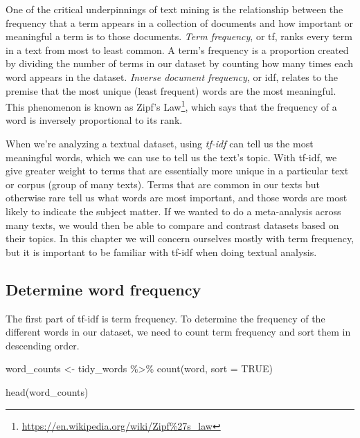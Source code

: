 \documentclass[
  krantz2]{krantz}
\makeatletter
\newenvironment{Shaded}{\begin{snugshade}}{\end{snugshade}}
\newcommand{\AttributeTok}[1]{\textcolor[rgb]{0.61,0.61,0.61}{#1}}
\newcommand{\ConstantTok}[1]{\textcolor[rgb]{0,0,0}{#1}}
\newcommand{\FunctionTok}[1]{\textcolor[rgb]{0,0,0}{#1}}
\newcommand{\NormalTok}[1]{#1}
\newcommand{\OtherTok}[1]{\textcolor[rgb]{0.37,0.37,0.37}{#1}}
\newcommand{\SpecialCharTok}[1]{\textcolor[rgb]{0,0,0}{#1}}
\newenvironment{kframe}{%
\medskip{}
\setlength{\fboxsep}{.8em}
 \def\at@end@of@kframe{}%
 \ifinner\ifhmode%
  \def\at@end@of@kframe{\end{minipage}}%
  \begin{minipage}{\columnwidth}%
 \fi\fi%
 \def\FrameCommand##1{\hskip\@totalleftmargin \hskip-\fboxsep
 \colorbox{shadecolor}{##1}\hskip-\fboxsep
     \hskip-\linewidth \hskip-\@totalleftmargin \hskip\columnwidth}%
 \MakeFramed {\advance\hsize-\width
   \@totalleftmargin\z@ \linewidth\hsize
   \@setminipage}}%
 {\par\unskip\endMakeFramed%
 \at@end@of@kframe}
\renewenvironment{Shaded}{\begin{kframe}}{\end{kframe}}
\makeatother
\begin{document}
One of the critical underpinnings of text mining is the relationship between the frequency that a term appears in a collection of documents and how important or meaningful a term is to those documents. \emph{Term frequency}, or tf, ranks every term in a text from most to least common. A term's frequency is a proportion created by dividing the number of terms in our dataset by counting how many times each word appears in the dataset. \emph{Inverse document frequency}, or idf, relates to the premise that the most unique (least frequent) words are the most meaningful. This phenomenon is known as Zipf's Law\footnote{\url{https://en.wikipedia.org/wiki/Zipf\%27s_law}}, which says that the frequency of a word is inversely proportional to its rank.

When we're analyzing a textual dataset, using \emph{tf-idf} can tell us the most meaningful words, which we can use to tell us the text's topic. With tf-idf, we give greater weight to terms that are essentially more unique in a particular text or corpus (group of many texts). Terms that are common in our texts but otherwise rare tell us what words are most important, and those words are most likely to indicate the subject matter. If we wanted to do a meta-analysis across many texts, we would then be able to compare and contrast datasets based on their topics. In this chapter we will concern ourselves mostly with term frequency, but it is important to be familiar with tf-idf when doing textual analysis.

\hypertarget{word-frequency}{%
\subsection{Determine word frequency}\label{word-frequency}}

The first part of tf-idf is term frequency. To determine the frequency of the different words in our dataset, we need to count term frequency and sort them in descending order.

\begin{Shaded}
\begin{Highlighting}[]
\NormalTok{word\_counts }\OtherTok{\textless{}{-}}\NormalTok{ tidy\_words }\SpecialCharTok{\%\textgreater{}\%}
  \FunctionTok{count}\NormalTok{(word, }\AttributeTok{sort =} \ConstantTok{TRUE}\NormalTok{) }

\FunctionTok{head}\NormalTok{(word\_counts)}
\end{Highlighting}
\end{Shaded}
\end{document}
